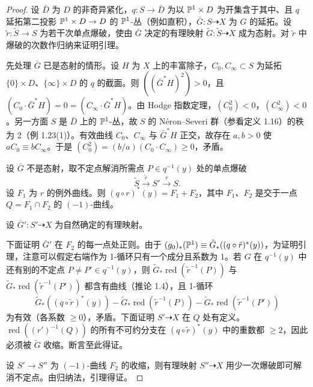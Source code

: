 \begin{proof}
设 $\bar D$ 为 $D$ 的非奇异紧化，$q: S\to\bar D$ 为以 $\mathbb{P}^1\times D$ 为开集含于其中、且 $q$ 延拓第二投影 $\mathbb{P}^1\times D\to D$ 的 $\mathbb{P}^1$-丛（例如直积），$\bar G: S\dashrightarrow X$ 为 $G$ 的延拓。设 $\tilde r:\tilde S\to S$ 为若干次单点爆破，使由 $\bar G$ 决定的有理映射 $\tilde G:\tilde S\dashrightarrow X$ 成为态射。对 $\tilde r$ 中爆破的次数作归纳来证明引理。

先处理 $\bar G$ 已是态射的情形。设 $H$ 为 $X$ 上的丰富除子，$C_0,C_\infty\subset S$ 为延拓 $\{0\}\times D$、$\{\infty\}\times D$ 的 $q$ 的截面。则 $((\bar G^*H)^2)>0$，且 $(C_0\cdot\bar G^*H)=0=(C_\infty\cdot\bar G^*H)$。由 Hodge 指数定理，$(C_0^2)<0$，$(C_\infty^2)<0$。另一方面 $S$ 是 $\bar D$ 上的 $\mathbb{P}^1$-丛，故 $S$ 的 Néron–Severi 群（参看定义 1.16）的秩为 2（例 1.23(1)）。有效曲线 $C_0$、$C_\infty$ 与 $\bar G^*H$ 正交，故存在 $a,b>0$ 使 $aC_0\equiv bC_\infty$。于是 $(C_0^2)=(b/a)(C_0\cdot C_\infty)\ge 0$，矛盾。


设 $\bar G$ 不是态射，取不定点解消所需点 $P\in q^{-1}(y)$ 处的单点爆破
\[ \tilde S\xrightarrow{\tilde r}S'\xrightarrow{r}S. \]
设 $F_1$ 为 $r$ 的例外曲线。则 $(q\circ r)^*(y)=F_1+F_2$，其中 $F_1$、$F_2$ 是交于一点 $Q=F_1\cap F_2$ 的 $(-1)$-曲线。

设 $\bar G': S'\dashrightarrow X$ 为自然确定的有理映射。

下面证明 $\bar G'$ 在 $F_2$ 的每一点处正则。由于 $(g_0)_*(\mathbb{P}^1)\equiv\tilde G_*((q\circ\tilde r)^*(y))$，为证明引理，注意可以假定右端作为 1-循环只有一个成分且系数为 1。若 $G$ 在 $q^{-1}(y)$ 中还有别的不定点 $P\ne P'\in q^{-1}(y)$，则 $\tilde G_*\operatorname{red}(\tilde r^{-1}(P))$ 与 $\tilde G_*\operatorname{red}(\tilde r^{-1}(P'))$ 都含有曲线（推论 1.4），且 1-循环
\[ \tilde G_*((q\circ\tilde r)^*(y))-\tilde G_*\operatorname{red}(\tilde r^{-1}(P))-\tilde G_*\operatorname{red}(\tilde r^{-1}(P')) \]
为有效（各系数 $\ge 0$），矛盾。下面证明 $S'\dashrightarrow X$ 在 $Q$ 处有定义。$\operatorname{red}((r')^{-1}(Q))$ 的所有不可约分支在 $(q\circ\tilde r)^*(y)$ 中的重数都 $\ge 2$，因此必须被 $\tilde G$ 收缩。断言至此得证。

设 $S'\to S''$ 为 $(-1)$-曲线 $F_2$ 的收缩，则有理映射 $S''\dashrightarrow X$ 用少一次爆破即可解消不定点。由归纳法，引理得证。
\end{proof}

